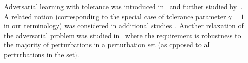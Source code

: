 Adversarial learning with tolerance was introduced in~\cite{ashtiani2023adversarially} and further studied by~\cite{bhattacharjee2023robust, raman2024proper}. A related notion (corresponding to the special case of tolerance parameter $\gamma = 1$ in our terminology) was considered in additional studies~\citep{montasser2021transductive,blum2022boosting}. Another relaxation of the adversarial problem was studied in~\cite{robey2022probabilistically, raman2024proper} where the requirement is robustness to the majority of perturbations in a perturbation set (as opposed to all perturbations in the set).